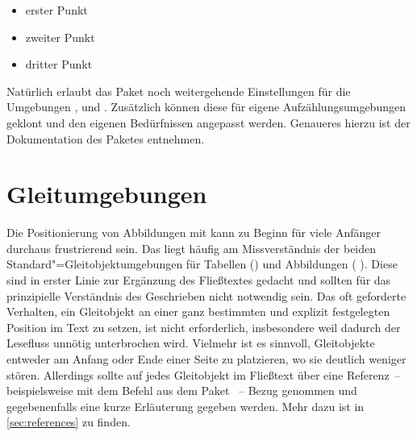 \documentclass[%
  english,ngerman,%
  geometry=no,DIV=12,automark,%
]{tudscrartcl}
\begin{document}
\begin{Trunk*}
\begin{itemize}
\item erster Punkt
\item zweiter Punkt
\item dritter Punkt
\end{itemize}

\end{Trunk*}
%
Natürlich erlaubt das Paket noch weitergehende Einstellungen für die Umgebungen 
,  und . 
Zusätzlich können diese für eigene Aufzählungsumgebungen geklont und den 
eigenen Bedürfnissen angepasst werden. Genaueres hierzu ist der Dokumentation 
des Paketes  entnehmen.



\section{Gleitumgebungen}
\label{sec:floats}
Die Positionierung von Abbildungen mit  kann zu Beginn für viele 
Anfänger durchaus frustrierend sein. Das liegt häufig am Missverständnis der 
beiden Standard"=Gleitobjektumgebungen für Tabellen () und 
Abbildungen ( ). Diese sind in erster Linie zur Ergänzung 
des Fließtextes gedacht und sollten für das prinzipielle Verständnis des 
Geschrieben nicht notwendig sein. Das oft geforderte Verhalten, ein Gleitobjekt 
an einer ganz bestimmten und explizit festgelegten Position im Text zu setzen, 
ist nicht erforderlich, insbesondere weil dadurch der Lesefluss unnötig 
unterbrochen wird. Vielmehr ist es sinnvoll, Gleitobjekte entweder am Anfang 
oder Ende einer Seite zu platzieren, wo sie deutlich weniger stören. Allerdings 
sollte auf jedes Gleitobjekt im Fließtext über eine Referenz~-- beispielsweise 
mit dem Befehl  aus dem Paket ~-- Bezug 
genommen und gegebenenfalls eine kurze Erläuterung gegeben werden. Mehr dazu 
ist in \autoref{sec:references} zu finden.
\end{document}

